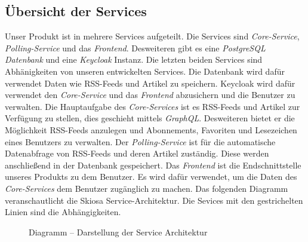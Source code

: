 \subsection{Übersicht der Services}
Unser Produkt ist in mehrere Services aufgeteilt. Die Services sind \textit{Core-Service}, \textit{Polling-Service} und das \textit{Frontend}.
Desweiteren gibt es eine \textit{PostgreSQL Datenbank} und eine \textit{Keycloak} Instanz. Die letzten beiden Services sind Abhänigkeiten von unseren entwickelten Services.
Die Datenbank wird dafür verwendet Daten wie RSS-Feeds und Artikel zu speichern.
Keycloak wird dafür verwendet den \textit{Core-Service} und das \textit{Frontend} abzusichern und die Benutzer zu verwalten.
Die Hauptaufgabe des \textit{Core-Services} ist es RSS-Feeds und Artikel zur Verfügung zu stellen, dies geschieht mittels \textit{GraphQL}. Desweiteren bietet er die Möglichkeit
RSS-Feeds anzulegen und Abonnements, Favoriten und Lesezeichen eines Benutzers zu verwalten.
Der \textit{Polling-Service} ist für die automatische Datenabfrage von RSS-Feeds und deren Artikel zuständig. Diese werden anschließend in der Datenbank gespeichert.
Das \textit{Frontend} ist die Endschnittstelle unseres Produkts zu dem Benutzer.
Es wird dafür verwendet, um die Daten des \textit{Core-Services} dem Benutzer zugänglich zu machen.
Das folgenden Diagramm veranschautlicht die Skiosa Service-Architektur. Die Sevices mit den gestrichelten Linien sind die Abhängigkeiten.
\begin{figure}[!htbp]
    \centering    
    \usetikzlibrary{positioning}
\caption{Diagramm – Darstellung der Service Architektur}
\end{figure}

